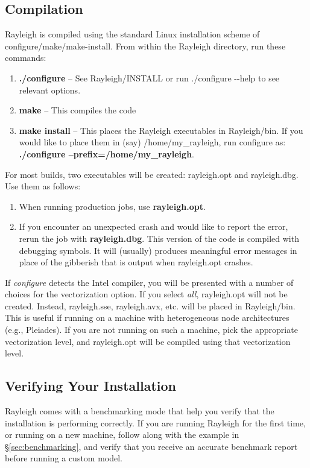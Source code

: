 \subsection{Compilation}
Rayleigh is compiled using the standard Linux installation scheme of configure/make/make-install.  From within the Rayleigh directory, run these commands:
\begin{enumerate}
\item \textbf{./configure}  -- See Rayleigh/INSTALL or run ./configure {-{}-}help to see relevant options.
\item \textbf{make} -- This compiles the code
\item \textbf{make install}  -- This places the Rayleigh executables in Rayleigh/bin.   If you would like to place them in (say) /home/my\_rayleigh, run configure as: \textbf{./configure --prefix=/home/my\_rayleigh}.
\end{enumerate}
For most builds, two executables will be created:  rayleigh.opt and rayleigh.dbg.  Use them as follows:
\begin{enumerate}
\item When running production jobs, use \textbf{rayleigh.opt}.
\item If you encounter an unexpected crash and would like to report the error, rerun the job with \textbf{rayleigh.dbg}.  This version of the code is compiled with debugging symbols.  It will (usually) produces meaningful error messages in place of the gibberish that is output when rayleigh.opt crashes.
\end{enumerate}

If \textit{configure} detects the Intel compiler, you will be presented with a number of choices for the vectorization option.  If you select \textit{all}, rayleigh.opt will not be created.  Instead, rayleigh.sse, rayleigh.avx, etc. will be placed in Rayleigh/bin.  This is useful if running on a machine with heterogeneous node architectures (e.g., Pleiades).  If you are not running on such a machine, pick the appropriate vectorization level, and rayleigh.opt will be compiled using that vectorization level.

\subsection{Verifying Your Installation}
Rayleigh comes with a benchmarking mode that help you verify that the installation is performing correctly.  If you are running Rayleigh for the first time, or running on a new machine, follow along with the example in \S \ref{sec:benchmarking}, and verify that you receive an accurate benchmark report before running a custom model.

